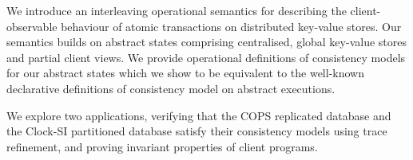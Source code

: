 We introduce an interleaving operational semantics for describing the
client-observable behaviour of atomic transactions on distributed
key-value stores. Our semantics builds on abstract states comprising
centralised, global key-value stores and partial client views. 
We provide operational definitions of consistency models for our abstract states  which
we show to be equivalent to the well-known declarative definitions
of consistency model on abstract executions. 
\begin{app}
We explore two applications, verifying that the COPS replicated database
and the Clock-SI  partitioned database satisfy their 
consistency models using trace refinement,
and proving invariant properties of client programs. 
\end{app}
